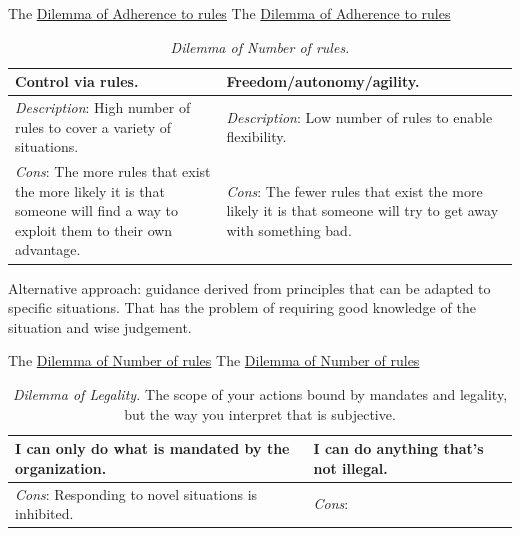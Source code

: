The \href{table:rule_adherence}{Dilemma of Adherence to rules}
The \href{table:rule_adherence}{Dilemma of Adherence to rules}



\begin{center}
\begin{table}[H] %
\begin{tabular}{ | m{\dilemmatablewidth}| m{\dilemmatablewidth} | } 
  \hline
  \textbf{Control via rules.} & \textbf{Freedom/autonomy/agility.} \\ 
  \hline
  \textit{Description}: High number of rules to cover a variety of situations. & 
  \textit{Description}: Low number of rules to enable flexibility. \\ 
  \hline
  \textit{Cons}: The more rules that exist the more likely it is that someone will find a way to exploit them to their own advantage. & 
  \textit{Cons}: The fewer rules that exist the more likely it is that someone will try to get away with something bad. \\  
  \hline
\end{tabular}
\caption{
\textit{Dilemma of Number of rules.}
}
\label{table:number_of_rules}
\end{table}
\end{center}
Alternative approach: guidance derived from principles that can be adapted to specific situations. That has the problem of requiring good knowledge of the situation and wise judgement.

The \href{table:number_of_rules}{Dilemma of Number of rules}
The \href{table:number_of_rules}{Dilemma of Number of rules}


\begin{center}
\begin{table}[H] %
\begin{tabular}{ | m{\dilemmatablewidth}| m{\dilemmatablewidth} | } 
  \hline
  \textbf{I can only do what is mandated by the organization.} & 
  \textbf{I can do anything that's not illegal.} \\ 
  \hline
  \textit{Cons}: Responding to novel situations is inhibited. &
  \textit{Cons}:  \\  
  \hline
\end{tabular}
\caption{
\textit{Dilemma of Legality.}
The scope of your actions bound by mandates and legality, but the way you interpret that is subjective.
}
\label{table:legality}
\end{table}
\end{center}

